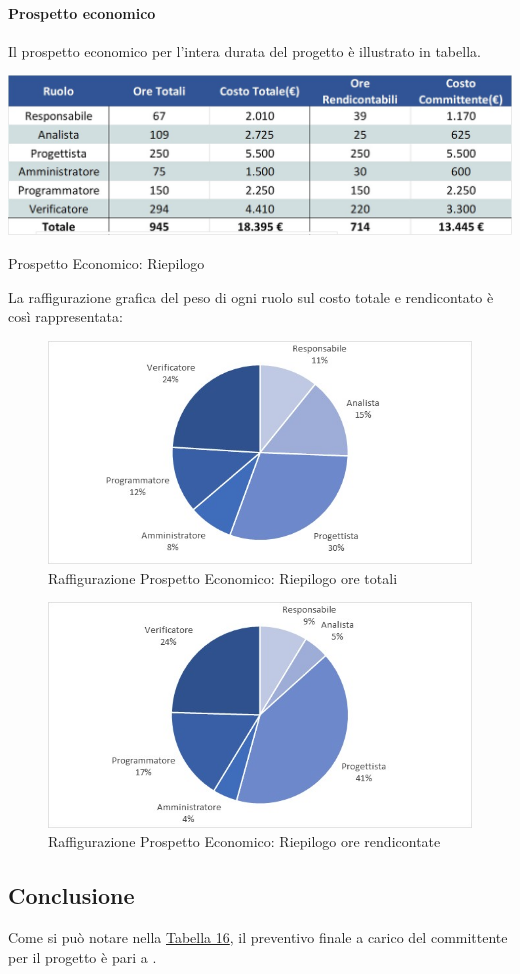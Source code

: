 \paragraph{Prospetto economico}
Il prospetto economico per l'intera durata del progetto è illustrato in tabella. 
\begin{table}[H]
	\centerline{\includegraphics[scale=0.6]{img/Preventivo/TotaleEconomico.jpg}}\label{Totale}
	\caption{Prospetto Economico: Riepilogo}
	\clearpage
\end{table}
\newpage
La raffigurazione grafica del peso di ogni ruolo sul costo totale e rendicontato è così rappresentata: 
\begin{figure}[H]
	\centerline{\includegraphics[scale=0.9]{img/Preventivo/Torte/Totale.jpg}}
	\caption{Raffigurazione Prospetto Economico: Riepilogo ore totali}
	\clearpage
\end{figure}
\begin{figure}[H]
	\centerline{\includegraphics[scale=0.9]{img/Preventivo/Torte/TotaleRendicontato.jpg}}
	\caption{Raffigurazione Prospetto Economico: Riepilogo ore rendicontate}
	\clearpage
\end{figure}

\subsection{Conclusione}
Come si può notare nella \hyperref[Totale]{Tabella 16}, il preventivo finale a carico del committente per il progetto è pari a .